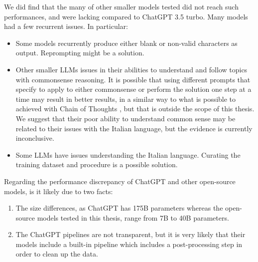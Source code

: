 We did find that the many of other smaller models tested did not reach such performances, and were lacking compared to ChatGPT 3.5 turbo. Many models had a few recurrent issues. In particular:
\begin{itemize}
    \item Some models recurrently produce either blank or non-valid characters as output. Reprompting might be a solution.
    \item Other smaller LLMs issues in their abilities to understand and follow topics with commonsense reasoning. It is possible that using different prompts that specify to apply to either commonsense or perform the solution one step at a time may result in better results, in a similar way to what is possible to achieved with Chain of Thoughts \cite{wei2023chainofthought}, but that is outside the scope of this thesis. We suggest that their poor ability to understand common sense may be related to their issues with the Italian language, but the evidence is currently inconclusive.
    \item Some LLMs have issues understanding the Italian language. Curating the training dataset and procedure  is a possible solution.
\end{itemize}

Regarding the performance discrepancy of ChatGPT and other open-source models, is it likely due to two facts:
\begin{enumerate}
    \item The size differences, as ChatGPT has 175B parameters \cite{chatgpt-parameters} whereas the open-source models tested in this thesis, range from 7B to 40B parameters.
    \item The ChatGPT pipelines are not transparent, but it is very likely that their models include a built-in pipeline which includes a post-processing step in order to clean up the data.
\end{enumerate}

